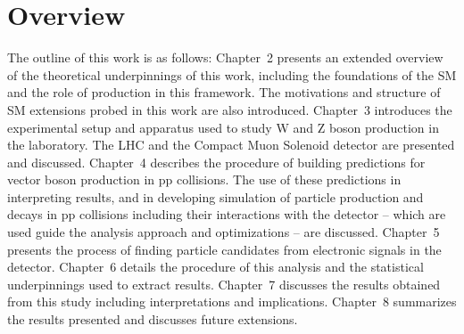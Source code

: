 \section{Overview}

The outline of this work is as follows: Chapter~2 presents an extended 
overview of the theoretical underpinnings of this work, including the foundations
of the SM and the role of \EWWZ production in this framework. The motivations 
and structure of SM extensions probed in this work are also introduced.
Chapter~3 introduces the experimental setup and apparatus used to study W and 
Z boson production in the laboratory. The LHC and the Compact Muon Solenoid 
detector are presented and discussed. Chapter~4 describes the procedure of 
building predictions for vector boson production in pp collisions.
The use of these predictions in interpreting results, and in developing simulation
of particle production and decays in pp collisions including their interactions
with the detector -- which are used 
guide the analysis approach and optimizations -- are discussed. Chapter~5 presents
the process of finding particle candidates from electronic signals in the detector.
Chapter~6 details the procedure of this analysis and the statistical underpinnings
used to extract results. Chapter~7 discusses the results obtained from this study
including interpretations and implications. Chapter~8 summarizes the
results presented and discusses future extensions.
